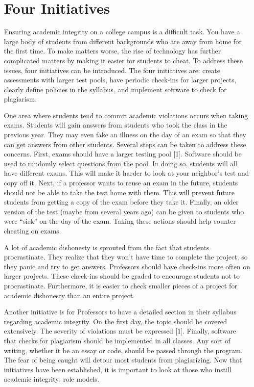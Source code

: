 \documentclass[11pt]{article}
\begin{document}
\section{Four Initiatives}
Ensuring academic integrity on a college campus is a difficult task. You have a large body of students from different backgrounds who are away from home for the first time. To make matters worse, the rise of technology has further complicated matters by making it easier for students to cheat. To address these issues, four initiatives can be introduced. The four initiatives are: create assessments with larger test pools, have periodic check-ins for larger projects, clearly define policies in the syllabus, and implement software to check for plagiarism.  

One area where students tend to commit academic violations occurs when taking exams. Students will gain answers from students who took the class in the previous year. They may even fake an illness on the day of an exam so that they can get answers from other students. Several steps can be taken to address these concerns. First, exams should have a larger testing pool [1]. Software should be used to randomly select questions from the pool. In doing so, students will all have different exams. This will make it harder to look at your neighbor's test and copy off it. Next, if a professor wants to reuse an exam in the future, students should not be able to take the test home with them. This will prevent future students from getting a copy of the exam before they take it. Finally, an older version of the test (maybe from several years ago) can be given to students who were “sick” on the day of the exam. Taking these actions should help counter cheating on exams.  

A lot of academic dishonesty is sprouted from the fact that students procrastinate. They realize that they won’t have time to complete the project, so they panic and try to get answers. Professors should have check-ins more often on larger projects. These check-ins should be graded to encourage students not to procrastinate. Furthermore, it is easier to check smaller pieces of a project for academic dishonesty than an entire project.   

Another initiative is for Professors to have a detailed section in their syllabus regarding academic integrity. On the first day, the topic should be covered extensively. The severity of violations must be expressed [1]. Finally, software that checks for plagiarism should be implemented in all classes. Any sort of writing, whether it be an essay or code, should be passed through the program. The fear of being caught will detour most students from plagiarizing. Now that initiatives have been established, it is important to look at those who instill academic integrity: role models. 
\end{document}
